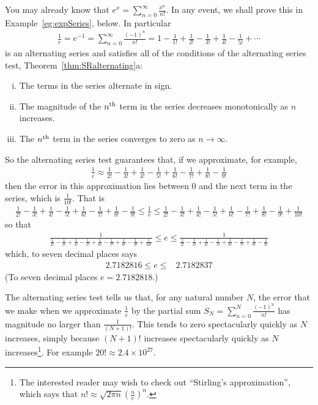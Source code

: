 \begin{eg}[$e$]\label{eg:SRaltharmonicB}
You may already know that
$
e^x=\sum_{n=0}^\infty\frac{x^n}{n!}
$. In any event, we shall prove this in Example~\ref{eg:expSeries},
below. In particular
\begin{align*}
\frac{1}{e}=e^{-1} = \sum_{n=0}^\infty\frac{(-1)^n}{n!}
 = 1 -\frac{1}{1!} +\frac{1}{2!} -\frac{1}{3!} +\frac{1}{4!}
                     - \frac{1}{5!}+\cdots
\end{align*}
is an alternating series and satisfies all of the conditions
of the alternating series test, Theorem~\ref{thm:SRalternating}a:
\begin{enumerate}[(i)]\itemsep1pt \parskip0pt  %
\item The terms in the series alternate in sign.
\item The magnitude of the $n^{\rm th}$ term in the series decreases
            monotonically as $n$ increases.
\item The $n^{\rm th}$ term in the series converges to zero as
$n\rightarrow\infty$.
\end{enumerate}
So the alternating series test guarantees that, if we approximate,
for example,
\begin{align*}
\frac{1}{e} \approx \frac{1}{2!}-\frac{1}{3!} +\frac{1}{4!}-\frac{1}{5!}+\frac{1}{6!}-\frac{1}{7!}
+\frac{1}{8!}-\frac{1}{9!}
\end{align*}
then the error in this approximation lies between $0$ and the
next term in the series, which is $\frac{1}{10!}$. That is
\begin{align*}
\frac{1}{2!}-\frac{1}{3!} +\frac{1}{4!}-\frac{1}{5!}+\frac{1}{6!}-\frac{1}{7!}
+\frac{1}{8!}-\frac{1}{9!}
\le \frac{1}{e} \le
\frac{1}{2!}-\frac{1}{3!} +\frac{1}{4!}-\frac{1}{5!}+\frac{1}{6!}-\frac{1}{7!}
+\frac{1}{8!}-\frac{1}{9!}+\frac{1}{10!}
\end{align*}
so that
\begin{align*}
\frac{1}{
\frac{1}{2!}-\frac{1}{3!} +\frac{1}{4!}-\frac{1}{5!}+\frac{1}{6!}-\frac{1}{7!}
+\frac{1}{8!}-\frac{1}{9!}+\frac{1}{10!}}
\le e \le
\frac{1}{
\frac{1}{2!}-\frac{1}{3!} +\frac{1}{4!}-\frac{1}{5!}+\frac{1}{6!}-\frac{1}{7!}
+\frac{1}{8!}-\frac{1}{9!}}
\end{align*}
which, to seven decimal places says
\begin{align*}
2.7182816 \le e\le  &2.7182837
\end{align*}
(To seven decimal places $e=2.7182818$.)

The alternating series test tells us that, for any natural number $N$,
the error that we make when we approximate $\frac{1}{e}$ by the
partial sum $S_N= \sum_{n=0}^N\frac{(-1)^n}{n!}$ has magnitude no
larger than $\frac{1}{(N+1)!}$. This tends to zero spectacularly quickly
as $N$ increases, simply because $(N+1)!$ increases spectacularly quickly as $N$ increases\footnote{The interested reader may wish to check out
``Stirling's approximation'', which says that $n!\approx \sqrt {2\pi n}
\left(\frac {n}{e}\right)^{n}$.}. For example $20!\approx 2.4\times 10^{27}$.
\end{eg}

